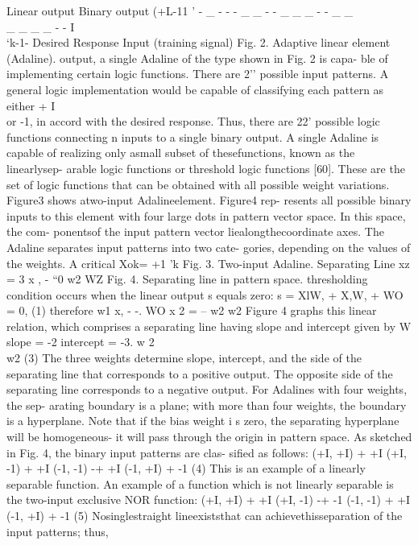 Linear output Binary output (+L-11 ' - \_ - - - \_ \_ - - \_ \_ \_ - -
\_ \_\\
\_ \_ \_ \_ - - I\\
`k-1- Desired Response Input (training signal) Fig. 2. Adaptive linear
element (Adaline). output, a single Adaline of the type shown in Fig. 2
is capa- ble of implementing certain logic functions. There are 2''
possible input patterns. A general logic implementation would be capable
of classifying each pattern as either + I\\
or -1, in accord with the desired response. Thus, there are 22' possible
logic functions connecting n inputs to a single binary output. A single
Adaline is capable of realizing only asmall subset of thesefunctions,
known as the linearlysep- arable logic functions or threshold logic
functions {[}60{]}. These are the set of logic functions that can be
obtained with all possible weight variations. Figure3 shows atwo-input
Adalineelement. Figure4 rep- resents all possible binary inputs to this
element with four large dots in pattern vector space. In this space, the
com- ponentsof the input pattern vector liealongthecoordinate axes. The
Adaline separates input patterns into two cate- gories, depending on the
values of the weights. A critical Xok= +1 'k Fig. 3. Two-input Adaline.
Separating Line xz = 3 x , - ``0 w2 WZ Fig. 4. Separating line in
pattern space. thresholding condition occurs when the linear output s
equals zero: s = XlW, + X,W, + WO = 0, (1) therefore w1 x, - -. WO x 2 =
-- w2 w2 Figure 4 graphs this linear relation, which comprises a
separating line having slope and intercept given by W slope = -2
intercept = -3. w 2\\
w2 (3) The three weights determine slope, intercept, and the side of the
separating line that corresponds to a positive output. The opposite side
of the separating line corresponds to a negative output. For Adalines
with four weights, the sep- arating boundary is a plane; with more than
four weights, the boundary is a hyperplane. Note that if the bias weight
i s zero, the separating hyperplane will be homogeneous- it will pass
through the origin in pattern space. As sketched in Fig. 4, the binary
input patterns are clas- sified as follows: (+I, +I) + +I (+I, -1) + +I
(-1, -1) -+ +I (-1, +I) + -1 (4) This is an example of a linearly
separable function. An example of a function which is not linearly
separable is the two-input exclusive NOR function: (+I, +I) + +I (+I,
-1) -+ -1 (-1, -1) + +I (-1, +I) + -1 (5) Nosinglestraight
lineexiststhat can achievethisseparation of the input patterns; thus,

